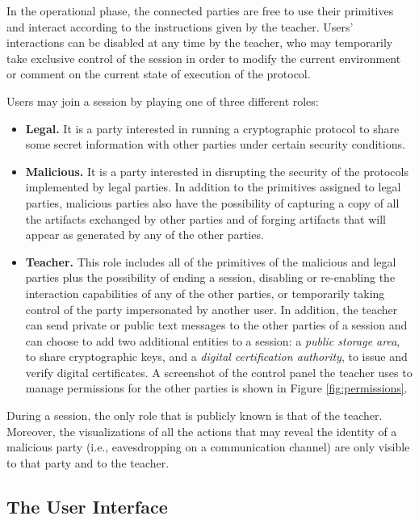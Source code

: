 \documentclass[conference]{IEEEtran}
\begin{document}
In the operational phase, the connected parties are free to use their
primitives and interact according to the instructions given by the
teacher. Users' interactions can be disabled at any time by the
teacher, who may temporarily take exclusive control of the session in
order to modify the current environment or comment on the current
state of execution of the protocol.

Users may join a session by playing one of three different roles:

\begin{itemize}
\item{\bf Legal.} It is a party interested in running a cryptographic protocol
to share some secret information with other parties under certain
security conditions.

\item{\bf Malicious.} It is a party interested in
disrupting the security of the protocols implemented by legal parties.
In addition to the primitives assigned to legal parties, malicious
parties also have the possibility of capturing a copy of all the
artifacts exchanged by other parties and of forging artifacts that
will appear as generated by any of the other parties.

\item{\bf Teacher.} This role includes all of the primitives of the malicious and
legal parties plus the possibility of ending a session, disabling or
re-enabling the interaction capabilities of any of the other parties,
or temporarily taking control of the party impersonated by another
user. In addition, the teacher can send private or public text
messages to the other parties of a session and can choose to add two
additional entities to a session: a {\em public storage area}, to share
cryptographic keys, and a {\em digital certification authority}, to
issue and verify digital certificates. A screenshot of the control
panel the teacher uses to manage permissions for the other parties is shown in
Figure \ref{fig:permissions}.
\end{itemize}

During a session, the only role that is publicly known is that of the
teacher. Moreover, the visualizations of all the actions that may
reveal the identity of a malicious party (i.e., eavesdropping on a
communication channel) are only visible to that party and to the
teacher.


\subsection{The User Interface}
\end{document}

